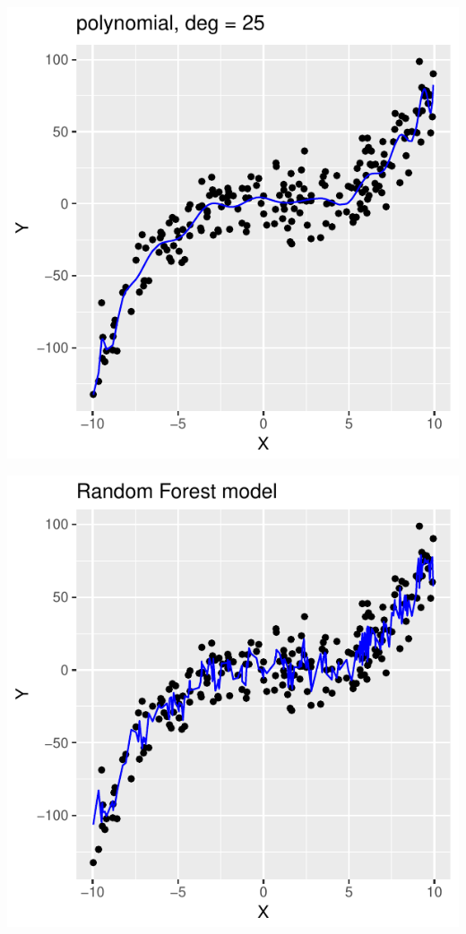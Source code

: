 \begin{frame}
\begin{analysis}
\begin{minipage}[c]{0.24\linewidth}
\end{minipage} 
\begin{minipage}[c]{0.24\linewidth}
\includegraphics[width=1.0\linewidth]{../LectureAssets/L04/SimpleRegCV25}
\end{minipage} 
\begin{minipage}[c]{0.24\linewidth}
\includegraphics[width=1.0\linewidth]{../LectureAssets/L04/SimpleRegCVRF}
\end{minipage} 
\bigskip


\end{analysis}
\end{frame}
